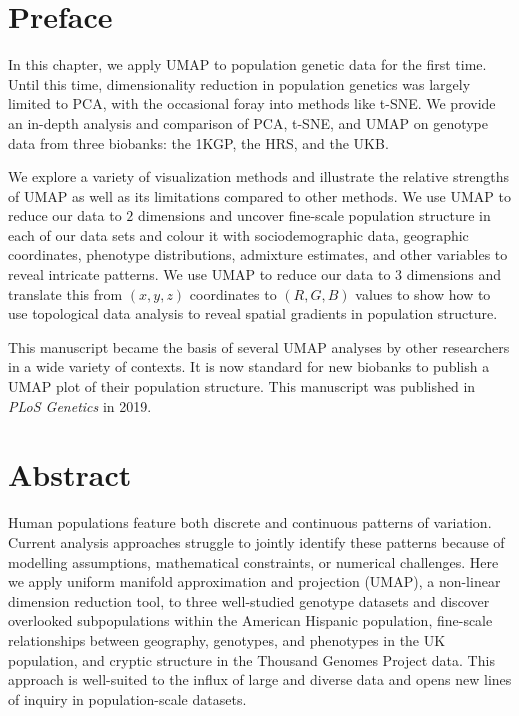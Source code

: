 \setcounter{section}{-1}

\section{Preface}

In this chapter, we apply UMAP to population genetic data for the first time. Until this time, dimensionality reduction in population genetics was largely limited to PCA, with the occasional foray into methods like t-SNE. We provide an in-depth analysis and comparison of PCA, t-SNE, and UMAP on genotype data from three biobanks: the 1KGP, the HRS, and the UKB.

We explore a variety of visualization methods and illustrate the relative strengths of UMAP as well as its limitations compared to other methods. We use UMAP to reduce our data to $2$ dimensions and uncover fine-scale population structure in each of our data sets and colour it with sociodemographic data, geographic coordinates, phenotype distributions, admixture estimates, and other variables to reveal intricate patterns. We use UMAP to reduce our data to $3$ dimensions and translate this from $(x,y,z)$ coordinates to $(R,G,B)$ values to show how to use topological data analysis to reveal spatial gradients in population structure.

This manuscript became the basis of several UMAP analyses by other researchers in a wide variety of contexts. It is now standard for new biobanks to publish a UMAP plot of their population structure. This manuscript was published in \textit{PLoS Genetics} in 2019.

\section{Abstract}

Human populations feature both discrete and continuous patterns of variation. Current analysis approaches struggle to jointly identify these patterns because of modelling assumptions, mathematical constraints, or numerical challenges. Here we apply uniform manifold approximation and projection (UMAP), a non-linear dimension reduction tool, to three well-studied genotype datasets and discover overlooked subpopulations within the American Hispanic population, fine-scale relationships between geography, genotypes, and phenotypes in the UK population, and cryptic structure in the Thousand Genomes Project data. This approach is well-suited to the influx of large and diverse data and opens new lines of inquiry in population-scale datasets.

